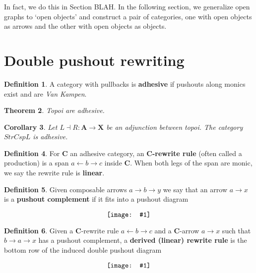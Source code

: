 \documentclass[]{amsart}
\newcommand{\A}{\cat{A}}
\newcommand{\C}{\cat{C}}
\newcommand{\X}{\cat{X}}
\newcommand{\defn}[1]{\textbf{#1}}
\newcommand{\cat}[1]{\mathbf{#1}}
\newcommand{\from}{\colon}
\newcommand{\diagram}[1]{\raisebox{-0.5\height}{\texttt{[image: \#1]}}}
\newtheorem{theorem}{Theorem}[section]
\newtheorem{corollary}[theorem]{Corollary}
\theoremstyle{remark}
\theoremstyle{definition}
\newtheorem{definition}[theorem]{Definition}
\begin{document}
In fact, we do this in Section BLAH. 
In the following section, we generalize open graphs to `open objects' and construct a pair of categories, one with open objects as arrows and the other with open objects as objects.  


\section{Double pushout rewriting} \label{sec:double-push-rewr} 

\begin{definition} \label{df_rw_adhesive-category} A category with pullbacks
  is \defn{adhesive} if pushouts along monics exist and are \emph{Van
    Kampen}.
\end{definition} 

\begin{theorem} \label{thm_rw_topoi-adhesive} Topoi are adhesive.
\end{theorem}

\begin{corollary} \label{thm_rw_category-StrCsp-adhsv}
 	Let $ L \dashv R \from \A \to \X $ be an adjunction between topoi.  The category $ StrCsp{L} $ is adhesive.
\end{corollary}

\begin{definition} \label{df_rw_rewrite-rule} For $ \C $ an adhesive category,
  an \defn{$ \C $-rewrite rule} (often called a production) is a span
  $ a \gets b \to c $ inside $ \C $.  When both legs of the span are
  monic, we say the rewrite rule is \defn{linear}.
\end{definition}	

\begin{definition} \label{df_rw_pushout-complement} Given composable arrows
  $ a \to b \to y $ we say that an arrow $ a \to x $ is a
  \defn{pushout complement} if it fits into a pushout diagram
  \[ \diagram{diag_rw_pushout-comp} \]
\end{definition}

\begin{definition} \label{df_rw_derived-rewrite-rule} Given a $ \C $-rewrite
  rule $ a \gets b \to c $ and a $ \C $-arrow $a \to x$ such that
  $ b \to a \to x $ has a pushout complement, a \defn{derived (linear)
    rewrite rule} is the bottom row of the induced double pushout
  diagram \[ \diagram{diag_rw_derived-rule} \]
\end{definition}
\end{document}
